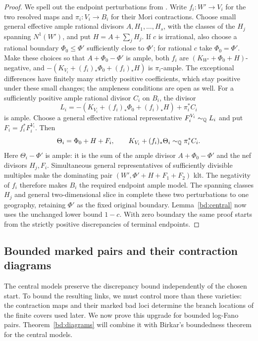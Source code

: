 \begin{proof}
We spell out the endpoint perturbations from
\cite[Lemma~4.1]{HM13}. Write $f_i:W'\to V_i$ for the two resolved
maps and $\pi_i:V_i\to B_i$ for their Mori contractions.
Choose small general effective ample rational
divisors $A,H_1,\ldots,H_s$, with the classes of the $H_j$ spanning
$N^1(W')$, and put $H=A+\sum_j H_j$. If $c$ is irrational, also
choose a rational boundary $\Phi_0\leq\Phi'$ sufficiently close to
$\Phi'$; for rational $c$ take $\Phi_0=\Phi'$. Make these choices so
that $A+\Phi_0-\Phi'$ is ample, both $f_i$ are
$(K_{W'}+\Phi_0+H)$-negative, and
$-(K_{V_i}+(f_i)_*\Phi_0+(f_i)_*H)$ is $\pi_i$-ample.
The exceptional differences have finitely many strictly positive
coefficients, which stay positive under these small changes;
the ampleness conditions are open as well.
For a sufficiently positive ample rational
divisor $C_i$ on $B_i$, the divisor
\[
 L_i=-(K_{V_i}+(f_i)_*\Phi_0+(f_i)_*H)+\pi_i^*C_i
\]
is ample. Choose a general effective rational representative
$F_i^{V_i}\sim_{\mathbb Q}L_i$ and put $F_i=f_i^*F_i^{V_i}$. Then
\[
 \Theta_i=\Phi_0+H+F_i,\qquad
 K_{V_i}+(f_i)_*\Theta_i\sim_{\mathbb Q}\pi_i^*C_i.
\]
Here $\Theta_i-\Phi'$ is ample: it is the sum of the ample divisor
$A+\Phi_0-\Phi'$ and the nef divisors $H_j,F_i$. Simultaneous general
representatives of sufficiently divisible multiples make the
dominating pair $(W',\Phi'+H+F_1+F_2)$ klt.
The negativity of $f_i$ therefore makes $B_i$ the required endpoint
ample model. The spanning classes $H_j$ and general two-dimensional
slice in \cite[Lemma~4.1]{HM13} complete these two perturbations to
one geography, retaining $\Phi'$ as the fixed original boundary.
Lemma~\ref{bd:central} now uses the unchanged lower bound
$1-c$.  With zero boundary the same proof starts from the
strictly positive discrepancies of terminal endpoints.
\end{proof}

\subsection{Bounded marked pairs and their contraction diagrams}

The central models preserve the discrepancy bound independently of the
chosen start. To bound the resulting links, we must control more than
these varieties: the contraction maps and their marked bad loci determine
the branch locations of the finite covers used later. We now prove this
upgrade for bounded log-Fano pairs. Theorem~\ref{bd:diagrams} will combine
it with Birkar's boundedness theorem for the central models.

